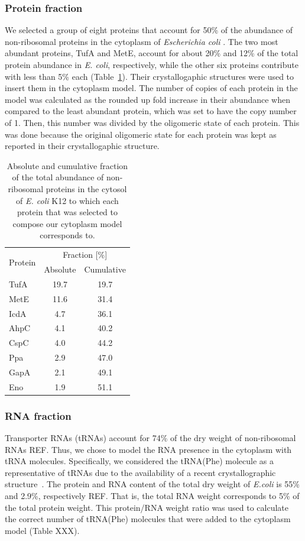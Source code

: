 \documentclass[journal=jacsat,manuscript=article]{achemso}
\begin{document}
\subsubsection{Protein fraction}
We selected a group of eight proteins that account for 50\% of the abundance of non-ribosomal proteins in the cytoplasm of {\em Escherichia coli} \cite{Link1997}. The two most abundant proteins, TufA and MetE, account for about 20\% and 12\% of the total protein abundance in {\em E. coli}, respectively, while the other six proteins contribute with less than 5\% each (Table~\ref{tbl:protein_fraction}). Their crystallogaphic structures were used to insert them in the cytoplasm model. The number of copies of each protein in the model was calculated as the rounded up fold increase in their abundance when compared to the least abundant protein, which was set to have the copy number of 1. Then, this number was divided by the oligomeric state of each protein. This was done because the original oligomeric state for each protein was kept as reported in their crystallogaphic structure.

\begin{table}[H]
\centering
\begin{tabular}{ l c c }
\hline
\multirow{2}{*}{Protein} & 	\multicolumn{2}{c}{Fraction [\%]} \\
& Absolute & Cumulative \\ 
\hline
TufA & 19.7 & 19.7 \\
MetE & 11.6 & 31.4 \\
IcdA & 4.7  & 36.1 \\
AhpC & 4.1  & 40.2 \\
CspC & 4.0  & 44.2 \\
Ppa  & 2.9  & 47.0 \\
GapA & 2.1  & 49.1 \\
Eno  & 1.9  & 51.1 \\
\hline
\end{tabular}
\caption{Absolute and cumulative fraction of the total abundance of non-ribosomal proteins in the cytosol of {\em E. coli} K12 to which each protein that was selected to compose our cytoplasm model corresponds to.}
\label{tbl:protein_fraction}
\end{table}


\subsubsection{RNA fraction}
Transporter RNAs (tRNAs) account for 74\% of the dry weight of non-ribosomal RNAs \colorbox{red!50}{REF}. Thus, we chose to model the RNA presence in the cytoplasm with tRNA molecules. Specifically, we considered the tRNA(Phe) molecule as a representative of tRNAs due to the availability of a recent crystallographic structure~\cite{Byrne2015}.
The protein and RNA content of the total dry weight of \textit{E.coli} is 55\% and 2.9\%, respectively \colorbox{red!50}{REF}. That is, the total RNA weight corresponds to 5\% of the total protein weight. This protein/RNA weight ratio was used to calculate the correct number of tRNA(Phe) molecules that were added to the cytoplasm model \colorbox{red!50}{(Table XXX)}.
\end{document}
